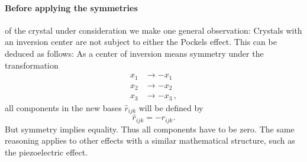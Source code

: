 \paragraph{Before applying the symmetries} 
of the crystal under consideration 
we make one general observation: Crystals with an inversion 
center are not subject to either the Pockels effect. 
This can be deduced as follows:
As a center of inversion means symmetry under the transformation 
\begin{equation}
    \begin{split}
    x_1 &\rightarrow -x_1 \\
    x_2 &\rightarrow -x_2 \\
    x_3 &\rightarrow -x_3  \, ,
    \end{split}
\end{equation}
all components in the new bases $\hat{r}_{ijk}$ will be defined 
by 
\begin{equation}
   \hat{r}_{ijk} = - r_{ijk}.
\end{equation}
But symmetry implies equality. Thus all components have to be zero. 
The same reasoning applies to other effects with a similar mathematical 
structure, such as the piezoelectric effect. 


